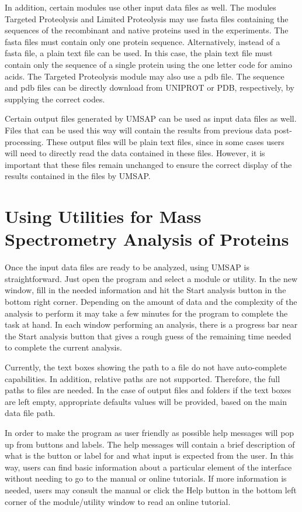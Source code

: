 In addition, certain modules use other input data files as well. The modules Targeted Proteolysis and Limited Proteolysis may use fasta files containing the sequences of the recombinant and native proteins used in the experiments. The fasta files must contain only one protein sequence. Alternatively, instead of a fasta file, a plain text file can be used. In this case, the plain text file must contain only the sequence of a single protein using the one letter code for amino acids. The Targeted Proteolysis module may also use a pdb file. The sequence and pdb files can be directly download from UNIPROT or PDB, respectively,  by supplying the correct codes.

Certain output files generated by UMSAP can be used as input data files as well. Files that can be used this way will contain the results from previous data post-processing. These output files will be plain text files, since in some cases users will need to directly read the data contained in these files. However, it is important that these files remain unchanged to ensure the correct display of the results contained in the files by UMSAP.

\section{Using Utilities for Mass Spectrometry Analysis of Proteins}

Once the input data files are ready to be analyzed, using UMSAP is straightforward. Just open the program and select a module or utility. In the new window, fill in the needed information and hit the Start analysis button in the bottom right corner. Depending on the amount of data and the complexity of the analysis to perform it may take a few minutes for the program to complete the task at hand. In each window performing an analysis, there is a progress bar near the Start analysis button that gives a rough guess of the remaining time needed to complete the current analysis.

Currently, the text boxes showing the path to a file  do not have auto-complete capabilities. In addition, relative paths are not supported. Therefore, the full paths to files are needed. In the case of output files and folders if the text boxes are left empty, appropriate defaults values will be provided, based on the main data file path.  

In order to make the program as user friendly as possible help messages will pop up from buttons and labels. The help messages will contain a brief description of what is the button or label for and what input is expected from the user. In this way, users can find basic information about a particular element of the interface without needing to go to the manual or online tutorials. If more information is needed, users may consult the manual or click the Help button in the bottom left corner of the module/utility window to read an online tutorial. 

